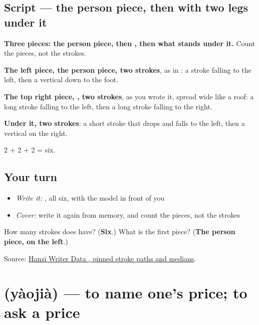 \subsection*{Script — the person piece, then  with two legs under it}

\begin{quote}
\end{quote}

\textbf{Three pieces: the person piece, then , then what stands under it.} Count the pieces, not the strokes.

\textbf{The left piece, the person piece, two strokes}, as in : a stroke falling to the left, then a vertical down to the foot.

\textbf{The top right piece, , two strokes}, as you wrote it, spread wide like a roof: a long stroke falling to the left, then a long stroke falling to the right.

\textbf{Under it, two strokes}: a short stroke that drops and falls to the left, then a vertical on the right.

2 + 2 + 2 = six.

\subsection*{Your turn}
\begin{itemize}
\raggedright
  \item \emph{Write it:} , all six, with the model in front of you
  \item \emph{Cover:} write it again from memory, and count the pieces, not the strokes
\end{itemize}

\begin{tcolorbox}[breakable,colback=teal!4,colframe=teal!35!black,title={Before you move on}]
How many strokes does  have? (\textbf{Six}.) What is the first piece? (\textbf{The person piece, on the left}.)

Source: \href{https://raw.githubusercontent.com/chanind/hanzi-writer-data/68d10a4b21150cae5e1ebbd223eed289cf32d90c/data/\%E4\%BB\%B7.json}{Hanzi Writer Data , pinned stroke paths and medians}.
\end{tcolorbox}
\section[\texorpdfstring{\zh{要价} (yàojià)}{要价 (yàojià)}]{ (yàojià) — to name one's price; to ask a price}


